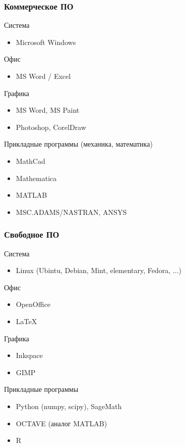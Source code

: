 \documentclass[12pt, compress]{beamer}
\renewcommand{\emph}[1]{\textcolor{dark-blue}{#1}}
\begin{document}
\begin{frame}
\frametitle{Коммерческое ПО}
\emph{Система}
\begin{itemize}
  \item Microsoft Windows
\end{itemize}  
\emph{Офис}
\begin{itemize}
  \item MS Word / Excel
\end{itemize}  
\emph{Графика}
\begin{itemize}
  \item MS Word, MS Paint  
  \item Photoshop, CorelDraw
\end{itemize}
\emph{Прикладные программы (механика, математика)}
\begin{itemize}    
  \item MathCad 
  \item Mathematica
  \item MATLAB
  \item MSC.ADAMS/NASTRAN, ANSYS 
\end{itemize}  
\end{frame}

\begin{frame}
\frametitle{Свободное ПО}
\emph{Система}
\begin{itemize}
  \item Linux (Ubintu, Debian, Mint, elementary, Fedora, ...)
\end{itemize}  
\emph{Офис}
\begin{itemize}
  \item OpenOffice
  \item LaTeX
\end{itemize}  
\emph{Графика}
\begin{itemize}  
  \item Inkspace
  \item GIMP
\end{itemize}    
\emph{Прикладные программы}
\begin{itemize}  
  \item Python (numpy, scipy), SageMath
  \item OCTAVE (аналог MATLAB)
  \item R
\end{itemize}  
\end{frame}
\end{document}
